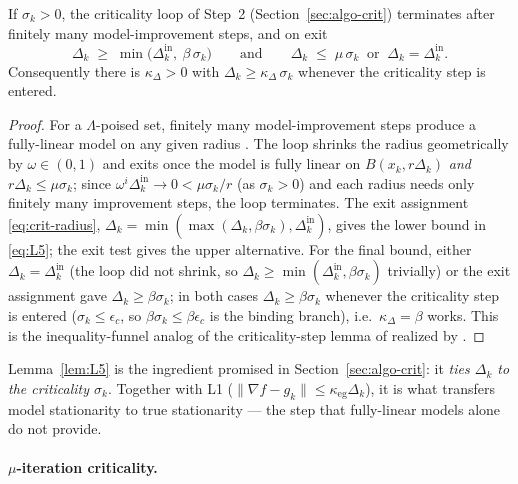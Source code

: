 \begin{lemma}[L5]
  \label{lem:L5}
  If $\sigma_k>0$, the criticality loop of Step~2 (Section~\ref{sec:algo-crit})
  terminates after finitely many model-improvement steps, and on exit
  \begin{equation}
    \label{eq:L5}
    \Delta_k \;\ge\; \min\bigl(\Delta_k^{\text{in}},\ \beta\,\sigma_k\bigr)
    \qquad\text{and}\qquad
    \Delta_k \;\le\; \mu\,\sigma_k \ \text{ or } \ \Delta_k=\Delta_k^{\text{in}} .
  \end{equation}
  Consequently there is $\kappa_\Delta>0$ with $\Delta_k\ge\kappa_\Delta\,\sigma_k$
  whenever the criticality step is entered.
\end{lemma}
\begin{proof}
  For a $\Lambda$-poised set, finitely many model-improvement steps produce a
  fully-linear model on any given radius \citep[Ch.~6, Theorem on model
  improvement]{CSV2009}. The loop shrinks the radius geometrically by $\omega\in(0,1)$
  and exits once the model is fully linear on $B(x_k,r\Delta_k)$ \emph{and}
  $r\Delta_k\le\mu\sigma_k$; since $\omega^i\Delta_k^{\text{in}}\to0<\mu\sigma_k/r$
  (as $\sigma_k>0$) and each radius needs only finitely many improvement steps, the
  loop terminates. The exit assignment \eqref{eq:crit-radius},
  $\Delta_k=\min(\max(\Delta_k,\beta\sigma_k),\Delta_k^{\text{in}})$, gives the lower
  bound in \eqref{eq:L5}; the exit test gives the upper alternative. For the final
  bound, either $\Delta_k=\Delta_k^{\text{in}}$ (the loop did not shrink, so
  $\Delta_k\ge\min(\Delta_k^{\text{in}},\beta\sigma_k)$ trivially) or the exit
  assignment gave $\Delta_k\ge\beta\sigma_k$; in both cases
  $\Delta_k\ge\beta\sigma_k$ whenever the criticality step is entered
  ($\sigma_k\le\epsilon_c$, so $\beta\sigma_k\le\beta\epsilon_c$ is the binding
  branch), i.e.\ $\kappa_\Delta=\beta$ works. This is the inequality-funnel analog of the criticality-step lemma of
  \citet[Ch.~10]{CSV2009} realized by .
\end{proof}

\noindent Lemma~\ref{lem:L5} is the ingredient promised in
Section~\ref{sec:algo-crit}: it \emph{ties $\Delta_k$ to the criticality
$\sigma_k$}. Together with L1 ($\|\nabla f-g_k\|\le\kappa_{\mathrm{eg}}\Delta_k$),
it is what transfers model stationarity to true stationarity --- the step that
fully-linear models alone do not provide.

\paragraph{$\mu$-iteration criticality.}

